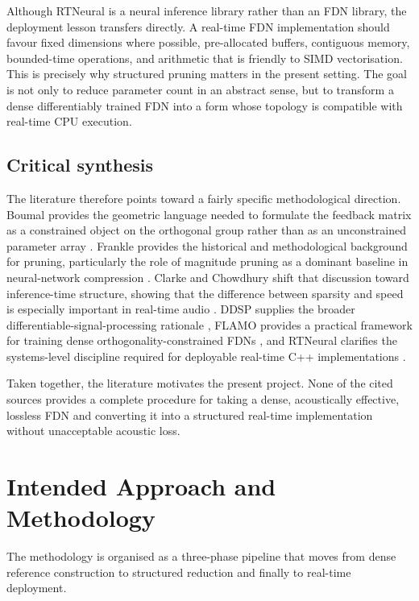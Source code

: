 \documentclass[12pt,a4paper]{article}
\begin{document}
Although RTNeural is a neural inference library rather than an FDN
library, the deployment lesson transfers directly. A real-time FDN
implementation should favour fixed dimensions where possible,
pre-allocated buffers, contiguous memory, bounded-time
operations, and arithmetic that is friendly to SIMD
vectorisation. This is precisely why structured pruning matters in
the present setting. The goal is not only to reduce parameter count
in an abstract sense, but to transform a dense differentiably trained
FDN into a form whose topology is compatible with real-time CPU
execution.

\subsection{Critical synthesis}

The literature therefore points toward a fairly specific
methodological direction. Boumal provides the geometric language
needed to formulate the feedback matrix as a constrained object on
the orthogonal group rather than as an unconstrained parameter
array \cite{boumal}. Frankle provides the historical and
methodological background for pruning, particularly the role of
magnitude pruning as a dominant baseline in neural-network
compression \cite{frankle}. Clarke and Chowdhury shift that
discussion toward inference-time structure, showing that the
difference between sparsity and speed is especially important in
real-time audio \cite{clarke}. DDSP supplies the
broader differentiable-signal-processing rationale
\cite{ddsp}, FLAMO provides a practical framework for
training dense orthogonality-constrained FDNs
\cite{flamo}, and RTNeural clarifies the systems-level
discipline required for deployable real-time C++ implementations
\cite{chowdhury}.

Taken together, the literature motivates the present project. None of the cited
sources provides a complete procedure for taking a dense, acoustically effective,
lossless FDN and converting it into a structured real-time implementation
without unacceptable acoustic loss.

\section{Intended Approach and Methodology}

The methodology is organised as a three-phase pipeline that moves from dense
reference construction to structured reduction and finally to real-time
deployment.
\end{document}
